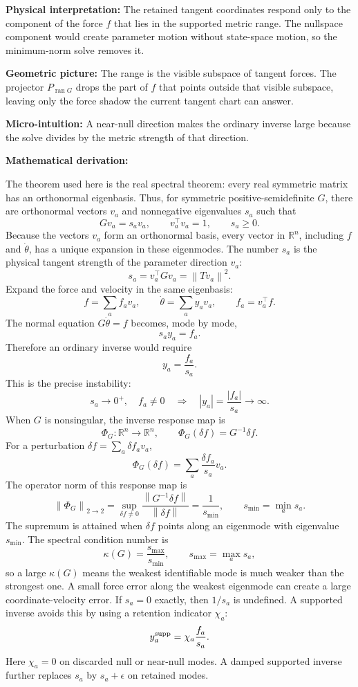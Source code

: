 \documentclass[10pt,twocolumn]{article}
\newcommand{\norm}[1]{\left\lVert #1\right\rVert}
\newcommand{\R}{\mathbb R}
\newcommand{\micro}[1]{%
  \par\smallskip
  \noindent\textcolor{deepblue}{\textbf{Micro-intuition:}} #1
  \par\smallskip}
\newcommand{\deriv}{%
  \par\noindent\textcolor{deepviolet}{\textbf{Mathematical derivation:}}\par\vspace{-1mm}}
\newcommand{\phys}[1]{%
  \par\smallskip
  \noindent\textcolor{deepgreen}{\textbf{Physical interpretation:}} #1
  \par\smallskip}
\newcommand{\geom}[1]{%
  \par\smallskip
  \noindent\textcolor{deepviolet}{\textbf{Geometric picture:}} #1
  \par\smallskip}
\begin{document}
\phys{The retained tangent coordinates respond only to the component of the
force \(f\) that lies in the supported metric range. The nullspace component
would create parameter motion without state-space motion, so the minimum-norm
solve removes it.}

\geom{The range is the visible subspace of tangent forces. The projector
\(P_{\operatorname{ran}G}\) drops the part of \(f\) that points outside that
visible subspace, leaving only the force shadow the current tangent chart can
answer.}

\micro{A near-null direction makes the ordinary inverse large because the solve
divides by the metric strength of that direction.}

\deriv
The theorem used here is the real spectral theorem: every real symmetric matrix
has an orthonormal eigenbasis. Thus, for symmetric positive-semidefinite \(G\),
there are orthonormal vectors \(v_a\) and nonnegative eigenvalues \(s_a\) such
that
\[
Gv_a=s_av_a,\qquad v_a^\top v_a=1,\qquad s_a\ge0.
\]
Because the vectors \(v_a\) form an orthonormal basis, every vector in
\(\R^n\), including \(f\) and \(\dot\theta\), has a unique expansion in these
eigenmodes.
The number \(s_a\) is the physical tangent strength of the parameter direction
\(v_a\):
\[
s_a=v_a^\top Gv_a=\norm{Tv_a}^2.
\]
Expand the force and velocity in the same eigenbasis:
\[
f=\sum_a f_av_a,\qquad
\dot\theta=\sum_a y_av_a,\qquad
f_a=v_a^\top f.
\]
The normal equation \(G\dot\theta=f\) becomes, mode by mode,
\[
s_ay_a=f_a.
\]
Therefore an ordinary inverse would require
\[
y_a=\frac{f_a}{s_a}.
\]
This is the precise instability:
\[
s_a\to0^+,\quad f_a\ne0
\quad\Longrightarrow\quad
|y_a|=\frac{|f_a|}{s_a}\to\infty.
\]
When \(G\) is nonsingular, the inverse response map is
\[
\Phi_G:\R^n\to\R^n,
\qquad
\Phi_G(\delta f)=G^{-1}\delta f.
\]
For a perturbation \(\delta f=\sum_a \delta f_av_a\),
\[
\Phi_G(\delta f)
=
\sum_a\frac{\delta f_a}{s_a}v_a.
\]
The operator norm of this response map is
\[
\norm{\Phi_G}_{2\to2}
=
\sup_{\delta f\ne0}
\frac{\norm{G^{-1}\delta f}}{\norm{\delta f}}
=
\frac{1}{s_{\min}},
\qquad
s_{\min}=\min_a s_a.
\]
The supremum is attained when \(\delta f\) points along an eigenmode with
eigenvalue \(s_{\min}\). The spectral condition number is
\[
\kappa(G)=\frac{s_{\max}}{s_{\min}},
\qquad
s_{\max}=\max_a s_a,
\]
so a large \(\kappa(G)\) means the weakest identifiable mode is much weaker
than the strongest one. A small force error along the weakest eigenmode can
create a large coordinate-velocity error.
If \(s_a=0\) exactly, then \(1/s_a\) is undefined. A supported inverse avoids
this by using a retention indicator \(\chi_a\):
\[
y_a^{\rm supp}
=\chi_a\frac{f_a}{s_a}.
\]
Here \(\chi_a=0\) on discarded null or near-null modes.
A damped supported inverse further replaces \(s_a\) by
\(s_a+\epsilon\) on retained modes.
\end{document}
